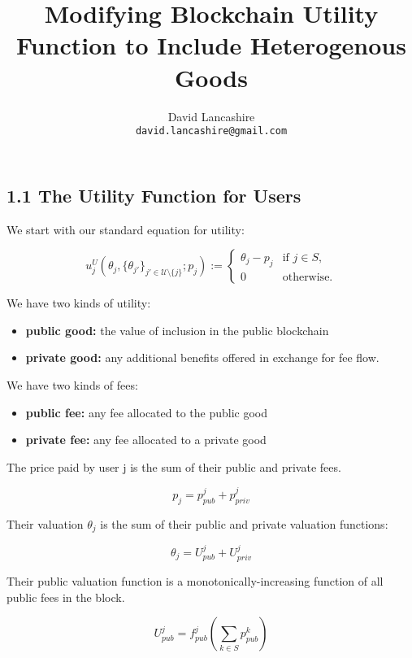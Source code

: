 \documentclass[oneside]{article}   	%
\title{Modifying Blockchain Utility Function to Include Heterogenous Goods}
\author{
  David Lancashire\\
  \texttt{david.lancashire@gmail.com}\\
}
\begin{document}
\maketitle

\subsection*{1.1 The Utility Function for Users}
\vspace{0.5em}

We start with our standard equation for utility: 

\[
u_j^U(\theta_j, \{\theta_{j'}\}_{j' \in \mathcal{U} \setminus \{j\}}; p_j) :=
\begin{cases}
\theta_j - p_j & \text{if } j \in S, \\
0 & \text{otherwise.}
\end{cases}     
\]              


We have two kinds of utility:

\begin{itemize}
  \item \textbf{public good:} the value of inclusion in the public blockchain
  \item \textbf{private good:} any additional benefits offered in exchange for fee flow.
\end{itemize}
\vspace{0.5em}

We have two kinds of fees:

\begin{itemize}
  \item \textbf{public fee:} any fee allocated to the public good
  \item \textbf{private fee:} any fee allocated to a private good
\end{itemize}
\vspace{0.5em}

The price paid by user j is the sum of their public and private fees.

$$
p_j = p_{pub}^j + p_{priv}^j
$$

Their valuation $\theta_j$ is the sum of their public and private valuation functions:

$$
\theta_j = U_{pub}^j + U_{priv}^j
$$

Their public valuation function is a monotonically-increasing function of all public fees in the block.

$$
U_{pub}^j = f_{pub}^j\left(\sum_{k \in S} p_{pub}^{k}\right)
$$
\end{document}
